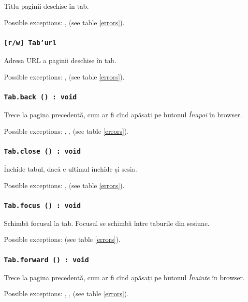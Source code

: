 Titlu paginii deschise în tab.

Possible exceptions: ,  (see table \ref{errors}).

\subsubsection{\texttt{[r/w] Tab'url}}

Adresa URL a paginii deschise în tab.

Possible exceptions: ,  (see table \ref{errors}).

\subsubsection{\texttt{Tab.back () : void}}

Trece la pagina precedentă, cum ar fi cînd apăsați pe butonul \textit{Înapoi} în browser.

Possible exceptions: , ,  (see table \ref{errors}).

\subsubsection{\texttt{Tab.close () : void}}

Închide tabul, dacă e ultimul închide și sesia.

Possible exceptions: ,  (see table \ref{errors}).

\subsubsection{\texttt{Tab.focus () : void}}

Schimbă focusul la tab. Focusul se schimbă între taburile din sesiune.

Possible exceptions:  (see table \ref{errors}).

\subsubsection{\texttt{Tab.forward () : void}}

Trece la pagina precedentă, cum ar fi cînd apăsați pe butonul \textit{Înainte} în browser.


Possible exceptions: , ,  (see table \ref{errors}).


